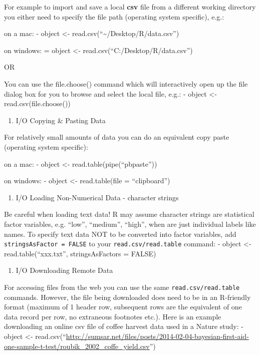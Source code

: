 \documentclass[]{book}
\providecommand{\tightlist}{%
  \setlength{\itemsep}{0pt}\setlength{\parskip}{0pt}}
\begin{document}
For example to import and save a local \textbf{csv} file from a different working directory you either need to specify the file path (operating system specific), e.g.:

on a mac:
- object \textless{}- read.csv(``\textasciitilde{}/Desktop/R/data.csv'')

on windows:
= object \textless{}- read.csv(``C:/Desktop/R/data.csv'')

OR

You can use the file.choose() command which will interactively open up the file dialog box for you to browse and select the local file, e.g.:
- object \textless{}- read.csv(file.choose())

\begin{enumerate}
\def\labelenumi{(\alph{enumi})}
\setcounter{enumi}{2}
\tightlist
\item
  I/O Copying \& Pasting Data
\end{enumerate}

For relatively small amounts of data you can do an equivalent copy paste (operating system specific):

on a mac:
- object \textless{}- read.table(pipe(``pbpaste''))

on windows:
- object \textless{}- read.table(file = ``clipboard'')

\begin{enumerate}
\def\labelenumi{(\alph{enumi})}
\setcounter{enumi}{3}
\tightlist
\item
  I/O Loading Non-Numerical Data - character strings
\end{enumerate}

Be careful when loading text data! R may assume character strings are statistical factor variables, e.g. ``low'', ``medium'', ``high'', when are just individual labels like names. To specify text data NOT to be converted into factor variables, add \texttt{stringsAsFactor\ =\ FALSE} to your \texttt{read.csv/read.table} command:
- object \textless{}- read.table(``xxx.txt'', stringsAsFactors = FALSE)

\begin{enumerate}
\def\labelenumi{(\alph{enumi})}
\setcounter{enumi}{4}
\tightlist
\item
  I/O Downloading Remote Data
\end{enumerate}

For accessing files from the web you can use the same \texttt{read.csv/read.table} commands. However, the file being downloaded does need to be in an R-friendly format (maximum of 1 header row, subsequent rows are the equivalent of one data record per row, no extraneous footnotes etc.). Here is an example downloading an online csv file of coffee harvest data used in a Nature study:
- object \textless{}- read.csv(``\url{http://sumsar.net/files/posts/2014-02-04-bayesian-first-aid-one-sample-t-test/roubik_2002_coffe_yield.csv}'')
\end{document}
